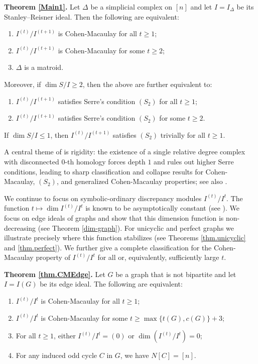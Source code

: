 \documentclass[12pt]{amsart}
\numberwithin{equation}{section}
\theoremstyle{definition}
\theoremstyle{definition}
\begin{document}
	\medskip
	
	\noindent\textbf{Theorem \ref{Main1}.} Let $\Delta$ be a simplicial complex on $[n]$ and let $I=I_{\Delta}$ be its Stanley--Reisner ideal.
	Then the following are equivalent:
	\begin{enumerate}
		\item[(1)] $I^{(t)}/I^{(t+1)}$ is Cohen-Macaulay for all $t\ge1$;
		\item[(2)] $I^{(t)}/I^{(t+1)}$ is Cohen-Macaulay for some $t\ge2$;
		\item[(3)] $\Delta$ is a matroid.
	\end{enumerate}
	Moreover, if $\dim S/I \ge2$, then the above are further equivalent to:
	\begin{enumerate}
		\item[(4)] $I^{(t)}/I^{(t+1)}$ satisfies Serre's condition $(S_2)$ for all $t\ge1$;
		\item[(5)] $I^{(t)}/I^{(t+1)}$ satisfies Serre's condition $(S_2)$ for some $t\ge2$.
	\end{enumerate}
	If $\dim S/I \le1$, then $I^{(t)}/I^{(t+1)}$ satisfies $(S_2)$ trivially for all $t\ge1$.
	
	\medskip
	
	A central theme of  is rigidity: the existence
	of a single relative degree complex with disconnected $0$-th homology forces
	depth $1$ and rules out higher Serre conditions, leading to sharp classification
	and collapse results for Cohen-Macaulay, $(S_2)$, and generalized
	Cohen-Macaulay properties; see also .
	
We continue to focus on symbolic-ordinary discrepancy modules $I^{(t)}/I^t$. The function $t \mapsto \dim I^{(t)}/I^t$ is known to be asymptotically constant (see \cite{HPV2008}). We focus on edge ideals of graphs and show that this dimension function is non-decreasing (see Theorem \ref{dim-graph}). For unicyclic and perfect graphs we illustrate precisely where this function stabilizes (see Theorems \ref{thm.unicyclic} and \ref{thm.perfect}). We further give a complete classification for the Cohen-Macaulay property of $I^{(t)}/I^t$ for all or, equivalently, sufficiently large $t$.

\medskip
	
	\noindent\textbf{Theorem \ref{thm.CMEdge}.}  Let $G$ be a graph that is not bipartite and let $I = I(G)$ be its edge ideal. The following are equivalent:
	\begin{enumerate}
		\item $I^{(t)}/I^{t}$ is Cohen-Macaulay for all $t \ge 1$;
		\item $I^{(t)}/I^{t}$ is Cohen-Macaulay for some $t\ge \max\{t(G),c(G)\}+3$;
		\item For all $t \ge 1$, either $I^{(t)}/I^t = (0)$ or $\dim(I^{(t)}/I^t) = 0$;
		\item For any induced odd cycle $C$ in $G$, we have $N[C] = [n]$.
	\end{enumerate}
\end{document}
